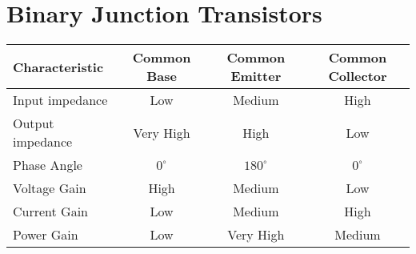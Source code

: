 \chapter{Binary Junction Transistors}

\begin{tabular}{l|ccc}
Characteristic   & Common Base & Common Emitter & Common Collector \\\hline
Input impedance  & Low         & Medium         & High \\
Output impedance & Very High   & High           & Low \\
Phase Angle      & $0^\circ$   & $180^\circ$    & $0^\circ$ \\
Voltage Gain     & High        & Medium         & Low \\
Current Gain     & Low         & Medium         & High \\
Power Gain       & Low         & Very High      & Medium \\
\end{tabular}